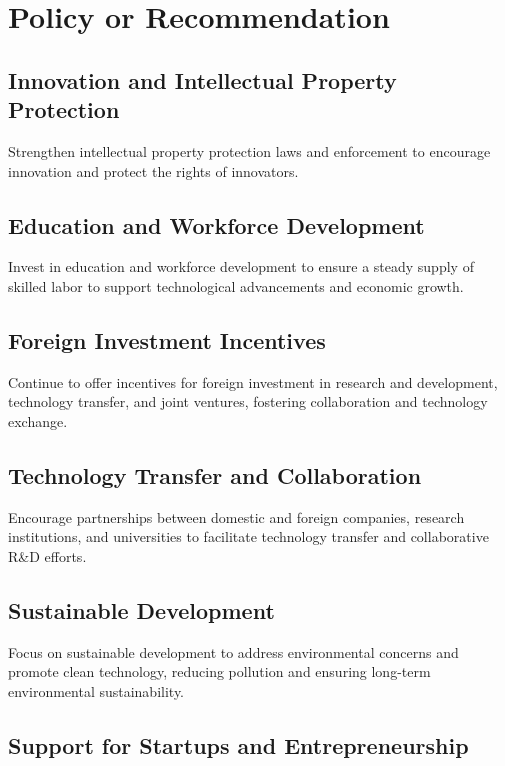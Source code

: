 \chapter{Policy or Recommendation}

\section{Innovation and Intellectual Property Protection}

Strengthen intellectual property protection laws and enforcement 
to encourage innovation and protect the rights of innovators.

\section{Education and Workforce Development}

Invest in education and workforce development to ensure a steady 
supply of skilled labor to support technological advancements 
and economic growth.

\section{Foreign Investment Incentives}

Continue to offer incentives for foreign investment in research 
and development, technology transfer, and joint ventures, 
fostering collaboration and technology exchange.

\section{Technology Transfer and Collaboration}

Encourage partnerships between domestic and foreign companies, 
research institutions, and universities to facilitate technology 
transfer and collaborative R\&D efforts.

\section{Sustainable Development}

Focus on sustainable development to address environmental concerns 
and promote clean technology, reducing pollution and ensuring 
long-term environmental sustainability.

\section{Support for Startups and Entrepreneurship}

